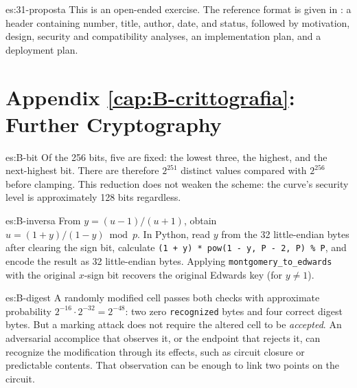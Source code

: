 \begin{soluzione}{es:31-proposta}
This is an open-ended exercise. The reference format is given in : a header containing number, title, author, date, and status, followed by motivation, design, security and compatibility analyses, an implementation plan, and a deployment plan.
\end{soluzione}

\section*{Appendix \ref{cap:B-crittografia}: Further Cryptography}

\begin{soluzione}{es:B-bit}
Of the 256 bits, five are fixed: the lowest three, the highest, and the next-highest bit. There are therefore $2^{251}$ distinct values compared with $2^{256}$ before clamping. This reduction does not weaken the scheme: the curve's security level is approximately 128 bits regardless.
\end{soluzione}

\begin{soluzione}{es:B-inversa}
From $y = (u-1)/(u+1)$, obtain $u = (1+y)/(1-y) \bmod p$. In Python, read $y$ from the 32 little-endian bytes after clearing the sign bit, calculate \texttt{(1 + y) * pow(1 - y, P - 2, P) \% P}, and encode the result as 32 little-endian bytes. Applying \texttt{montgomery\_to\_edwards} with the original $x$-sign bit recovers the original Edwards key (for $y \neq 1$).
\end{soluzione}

\begin{soluzione}{es:B-digest}
A randomly modified cell passes both checks with approximate probability $2^{-16} \cdot 2^{-32} = 2^{-48}$: two zero \texttt{recognized} bytes and four correct digest bytes. But a marking attack does not require the altered cell to be \emph{accepted}. An adversarial accomplice that observes it, or the endpoint that rejects it, can recognize the modification through its effects, such as circuit closure or predictable contents. That observation can be enough to link two points on the circuit.
\end{soluzione}
